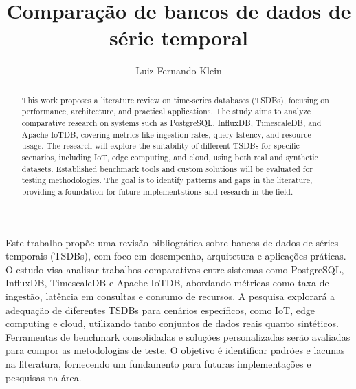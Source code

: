 \documentclass[portuguese,oneside]{UFFStex}
\author{Luiz Fernando Klein}
\title{Comparação de bancos de dados de série temporal}
      {Comparison of time series databases}
\begin{document}
\fichacatalografica




\begin{resumo}
Este trabalho propõe uma revisão bibliográfica sobre bancos de dados de séries temporais (TSDBs), com foco em desempenho, arquitetura e aplicações práticas. O estudo visa analisar trabalhos comparativos entre sistemas como PostgreSQL, InfluxDB, TimescaleDB e Apache IoTDB, abordando métricas como taxa de ingestão, latência em consultas e consumo de recursos. A pesquisa explorará a adequação de diferentes TSDBs para cenários específicos, como IoT, edge computing e cloud, utilizando tanto conjuntos de dados reais quanto sintéticos. Ferramentas de benchmark consolidadas e soluções personalizadas serão avaliadas para compor as metodologias de teste. O objetivo é identificar padrões e lacunas na literatura, fornecendo um fundamento para futuras implementações e pesquisas na área.
\end{resumo}

\begin{abstract}
This work proposes a literature review on time-series databases (TSDBs), focusing on performance, architecture, and practical applications. The study aims to analyze comparative research on systems such as PostgreSQL, InfluxDB, TimescaleDB, and Apache IoTDB, covering metrics like ingestion rates, query latency, and resource usage. The research will explore the suitability of different TSDBs for specific scenarios, including IoT, edge computing, and cloud, using both real and synthetic datasets. Established benchmark tools and custom solutions will be evaluated for testing methodologies. The goal is to identify patterns and gaps in the literature, providing a foundation for future implementations and research in the field.
\end{abstract}
\end{document}
